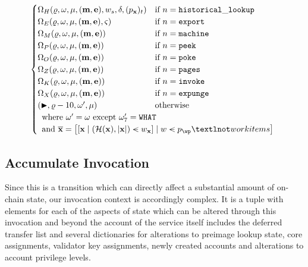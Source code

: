 \begin{align}
\begin{cases}
      \Omega_H(\gascounter, \registers, \memory, (\mathbf{m}, \mathbf{e}), w_s, \accounts, (p_\mathbf{x})_t) &\when n = \mathtt{historical\_lookup}\\
      \Omega_E(\gascounter, \registers, \memory, (\mathbf{m}, \mathbf{e}), \segoff) &\when n = \mathtt{export}\\
      \Omega_M(\gascounter, \registers, \memory, (\mathbf{m}, \mathbf{e})) &\when n = \mathtt{machine}\\
      \Omega_P(\gascounter, \registers, \memory, (\mathbf{m}, \mathbf{e})) &\when n = \mathtt{peek}\\
      \Omega_O(\gascounter, \registers, \memory, (\mathbf{m}, \mathbf{e})) &\when n = \mathtt{poke}\\
      \Omega_Z(\gascounter, \registers, \memory, (\mathbf{m}, \mathbf{e})) &\when n = \mathtt{pages}\\
      \Omega_K(\gascounter, \registers, \memory, (\mathbf{m}, \mathbf{e})) &\when n = \mathtt{invoke}\\
      \Omega_X(\gascounter, \registers, \memory, (\mathbf{m}, \mathbf{e})) &\when n = \mathtt{expunge}\\
      (\continue, \gascounter - 10, \registers', \memory) &\otherwise\\
      \multicolumn{2}{l}{\where \registers' = \registers \exc \registers'_7 = \mathtt{WHAT}} \\
      \multicolumn{2}{l}{\also \overline{\mathbf{x}} = \sq{\sq{\mathbf{x} \mid (\blake(\mathbf{x}), \len{\mathbf{x}}) \orderedin w_\mathbf{x}} \mid w \orderedin p_\wp¬workitems}}
    \end{cases}
\end{align}

\subsection{Accumulate Invocation}\label{sec:accumulateinvocation}

Since this is a transition which can directly affect a substantial amount of on-chain state, our invocation context is accordingly complex. It is a tuple with elements for each of the aspects of state which can be altered through this invocation and beyond the account of the service itself includes the deferred transfer list and several dictionaries for alterations to preimage lookup state, core assignments, validator key assignments, newly created accounts and alterations to account privilege levels.

